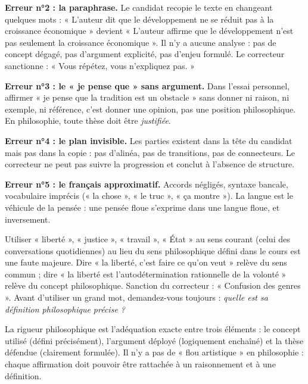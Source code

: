 \documentclass[11pt]{article}
\newcommand{\cle}[1]{{\popxbold\color{popdark}#1}}
\begin{document}
\textbf{Erreur n°2 : la paraphrase.} Le candidat recopie le texte en changeant quelques mots : « L'auteur dit que le développement ne se réduit pas à la croissance économique » devient « L'auteur affirme que le développement n'est pas seulement la croissance économique ». Il n'y a aucune analyse : pas de concept dégagé, pas d'argument explicité, pas d'enjeu formulé. Le correcteur sanctionne : « Vous répétez, vous n'expliquez pas. »

\textbf{Erreur n°3 : le « je pense que » sans argument.} Dans l'essai personnel, affirmer « je pense que la tradition est un obstacle » sans donner ni raison, ni exemple, ni référence, c'est donner une opinion, pas une position philosophique. En philosophie, toute thèse doit être \emph{justifiée}.

\textbf{Erreur n°4 : le plan invisible.} Les parties existent dans la tête du candidat mais pas dans la copie : pas d'alinéa, pas de transitions, pas de connecteurs. Le correcteur ne peut pas suivre la progression et conclut à l'absence de structure.

\textbf{Erreur n°5 : le français approximatif.} Accords négligés, syntaxe bancale, vocabulaire imprécis (« la chose », « le truc », « ça montre »). La langue est le véhicule de la pensée : une pensée floue s'exprime dans une langue floue, et inversement.

\begin{attention}
Utiliser « liberté », « justice », « travail », « État » au sens courant (celui des conversations quotidiennes) au lieu du sens philosophique défini dans le cours est une faute majeure. Dire « la liberté, c'est faire ce qu'on veut » relève du sens commun ; dire « la liberté est l'autodétermination rationnelle de la volonté » relève du concept philosophique. Sanction du correcteur : « Confusion des genres ». Avant d'utiliser un grand mot, demandez-vous toujours : \emph{quelle est sa définition philosophique précise ?}
\end{attention}

\begin{definition}
La \cle{rigueur philosophique} est l'adéquation exacte entre trois éléments : le \cle{concept} utilisé (défini précisément), l'\cle{argument} déployé (logiquement enchaîné) et la \cle{thèse} défendue (clairement formulée). Il n'y a pas de « flou artistique » en philosophie : chaque affirmation doit pouvoir être rattachée à un raisonnement et à une définition.
\end{definition}
\end{document}
